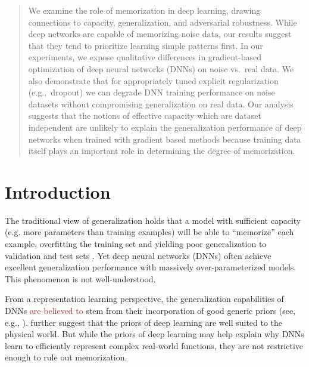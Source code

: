\documentclass{article}
\newcommand{\da}[1]{\textcolor{brown}{#1}}
\newcommand{\da}[1]{\textcolor{black}{#1}}
\begin{document}
\begin{abstract}
We examine the role of memorization in deep learning, drawing connections to capacity, generalization, and adversarial robustness.
While deep networks are capable of memorizing noise data, our results suggest that they tend to prioritize learning simple patterns first.
In our experiments, we expose qualitative differences in gradient-based optimization of deep neural networks (DNNs) on noise vs.~real data.
We also demonstrate that for appropriately tuned explicit regularization (e.g.,~dropout) we can degrade DNN training performance on noise datasets without compromising generalization on real data.
Our analysis suggests that the notions of effective capacity which are dataset independent are unlikely to explain the generalization performance of deep networks when trained with gradient based methods because training data itself plays an important role in determining the degree of memorization.
\end{abstract}






\section{Introduction}

The traditional view of generalization holds that a model with sufficient capacity (e.g. more parameters than training examples) will be able to ``memorize'' each example, overfitting the training set and yielding poor generalization to validation and test sets \citep{dl_book}.
Yet deep neural networks (DNNs) often achieve excellent generalization performance with massively over-parameterized models. This phenomenon is not well-understood.

From a representation learning perspective, the generalization capabilities of DNNs \da{are believed to} stem from their incorporation of good generic priors (see, e.g., \citet{bengio2009}). 
\citet{Tegmark} further suggest that the priors of deep learning are well suited to the physical world. 
But while the priors of deep learning may help explain why DNNs learn to efficiently represent complex real-world functions, they are not restrictive enough to rule out memorization.
\end{document}
